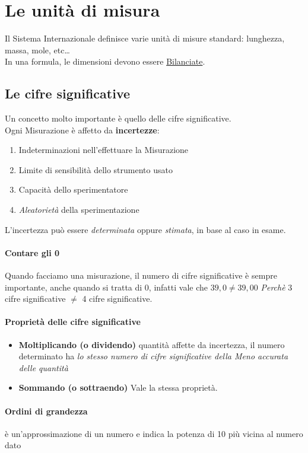 \documentclass[12pt, a4paper, openany]{book}
\begin{document}
\section{Le unità di misura}
Il Sistema Internazionale definisce varie unità di misure standard: lunghezza, massa, mole, etc\dots
\\In una formula, le dimensioni devono essere \underline{Bilanciate}.
\subsection{Le cifre significative}
Un concetto molto importante è quello delle cifre significative.
\\Ogni Misurazione è affetto da \textbf{incertezze}:
\begin{enumerate}
    \item Indeterminazioni nell'effettuare la Misurazione
    \item Limite di sensibilità dello strumento usato
    \item Capacità dello sperimentatore
    \item \emph{Aleatorietà} della sperimentazione
\end{enumerate}
L'incertezza può essere \emph{determinata} oppure \emph{stimata}, in base al caso in esame.
\paragraph{Contare gli 0} Quando facciamo una misurazione, il numero di cifre significative è sempre importante, anche quando si tratta di 0,
infatti vale che $39,0 \neq 39,00$ \emph{Perchè} 3 cifre significative $\neq$ 4 cifre significative.
\paragraph{Proprietà delle cifre significative}
\begin{itemize}
    \item \textbf{Moltiplicando (o dividendo)} quantità affette da incertezza, il numero determinato ha \emph{lo stesso numero di cifre significative della Meno accurata delle quantità}
    \item \textbf{Sommando (o sottraendo)} Vale la stessa proprietà.
\end{itemize}



\paragraph{Ordini di grandezza}
è un'approssimazione di un numero e indica la potenza di 10 più vicina al numero dato
\end{document}
